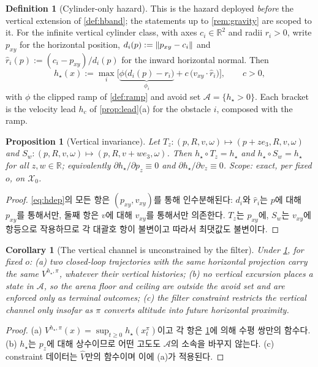 \documentclass[11pt]{article}
\theoremstyle{plain}
\newtheorem{proposition}[theorem]{Proposition}
\newtheorem{corollary}[theorem]{Corollary}
\theoremstyle{definition}
\newtheorem{definition}[theorem]{Definition}
\theoremstyle{remark}
\newcommand{\R}{\mathbb{R}}
\DeclarePairedDelimiter{\norm}{\lVert}{\rVert}
\newcommand{\calX}{\mathcal{X}}
\newcommand{\calA}{\mathcal{A}}
\newcommand{\Vhat}{\widehat V}
\newcommand{\eqdef}{:=}
\begin{document}
\begin{definition}[Cylinder-only hazard]\label{def:hdep}
This is the hazard deployed \emph{before} the vertical extension of \cref{def:hband}; the
statements up to \cref{rem:gravity} are scoped to it. For the infinite vertical cylinder class,
with axes $c_i\in\R^2$ and radii $r_i>0$, write $p_{xy}$ for the horizontal position,
$d_i(p)\eqdef\norm{p_{xy}-c_i}$ and $\hat r_i(p)\eqdef(c_i-p_{xy})/d_i(p)$ for the inward
horizontal normal. Then
\begin{equation}\label{eq:hdep}
h_\star(x)\eqdef\max_i\Big[\underbrace{\phi\big(d_i(p)-r_i\big)}_{\phi_i}+c\,\big(v_{xy}\cdot\hat r_i\big)\Big],
\qquad c>0,
\end{equation}
with $\phi$ the clipped ramp of \cref{def:ramp} and avoid set $\calA=\{h_\star>0\}$. Each bracket
is the velocity lead $h_c$ of \cref{prop:lead}(a) for the obstacle $i$, composed with the ramp.
\end{definition}

\begin{proposition}[Vertical invariance]\label{prop:vert}
Let $T_z:(p,R,v,\omega)\mapsto(p+ze_3,R,v,\omega)$ and
$S_w:(p,R,v,\omega)\mapsto(p,R,v+we_3,\omega)$. Then $h_\star\circ T_z=h_\star$ and
$h_\star\circ S_w=h_\star$ for all $z,w\in\R$; equivalently
$\partial h_\star/\partial p_z\equiv0$ and $\partial h_\star/\partial v_z\equiv0$.
Scope: exact, per fixed $o$, on $\calX_0$.
\end{proposition}
\begin{proof}
\cref{eq:hdep}의 모든 항은 $(p_{xy},v_{xy})$를 통해 인수분해된다: $d_i$와 $\hat r_i$는 $p$에 대해
$p_{xy}$를 통해서만, 둘째 항은 $v$에 대해 $v_{xy}$를 통해서만 의존한다. $T_z$는 $p_{xy}$에,
$S_w$는 $v_{xy}$에 항등으로 작용하므로 각 대괄호 항이 불변이고 따라서 최댓값도 불변이다.
\end{proof}

\begin{corollary}[The vertical channel is unconstrained by the filter]\label{cor:vert-filter}
Under \cref{prop:vert}, for fixed $o$: (a) two closed-loop trajectories with the same horizontal
projection carry the same $V^{h_\star,\pi}$, whatever their vertical histories; (b) no vertical
excursion places a state in $\calA$, so the arena floor and ceiling are outside the avoid set
and are enforced only as terminal outcomes; (c) the filter constraint restricts the vertical
channel only insofar as $\pi$ converts altitude into future horizontal proximity.
\end{corollary}
\begin{proof}
(a) $V^{h_\star,\pi}(x)=\sup_{t\ge0}h_\star(x^\pi_t)$이고 각 항은 \cref{prop:vert}에 의해 수평
쌍만의 함수다. (b) $h_\star$는 $p_z$에 대해 상수이므로 어떤 고도도 $\calA$의 소속을 바꾸지 않는다.
(c) constraint 데이터는 $\Vhat$만의 함수이며 이에 (a)가 적용된다.
\end{proof}
\end{document}
